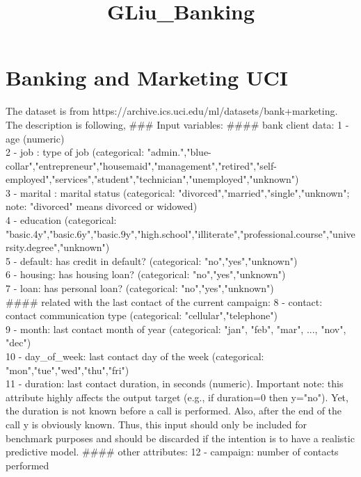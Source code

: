 \documentclass[11pt]{article}
\title{GLiu\_Banking}
\begin{document}
    
    
    \maketitle
    
    

    
    \section{Banking and Marketing UCI}\label{banking-and-marketing-uci}

    The dataset is from
https://archive.ics.uci.edu/ml/datasets/bank+marketing. The description
is following, \#\#\# Input variables: \#\#\#\# bank client data: 1 - age
(numeric)\\
2 - job : type of job (categorical:
"admin.","blue-collar","entrepreneur","housemaid","management","retired","self-employed","services","student","technician","unemployed","unknown")\\
3 - marital : marital status (categorical:
"divorced","married","single","unknown"; note: "divorced" means divorced
or widowed)\\
4 - education (categorical:
"basic.4y","basic.6y","basic.9y","high.school","illiterate","professional.course","university.degree","unknown")\\
5 - default: has credit in default? (categorical:
"no","yes","unknown")\\
6 - housing: has housing loan? (categorical: "no","yes","unknown")\\
7 - loan: has personal loan? (categorical: "no","yes","unknown")\\
\#\#\#\# related with the last contact of the current campaign: 8 -
contact: contact communication type (categorical:
"cellular","telephone")\\
9 - month: last contact month of year (categorical: "jan", "feb", "mar",
..., "nov", "dec")\\
10 - day\_of\_week: last contact day of the week (categorical:
"mon","tue","wed","thu","fri")\\
11 - duration: last contact duration, in seconds (numeric). Important
note: this attribute highly affects the output target (e.g., if
duration=0 then y="no"). Yet, the duration is not known before a call is
performed. Also, after the end of the call y is obviously known. Thus,
this input should only be included for benchmark purposes and should be
discarded if the intention is to have a realistic predictive model.
\#\#\#\# other attributes: 12 - campaign: number of contacts performed
\end{document}
